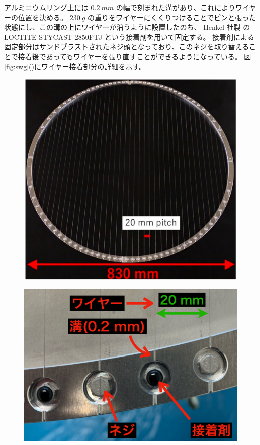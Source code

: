 \documentclass[../../main.tex]{subfiles}
\begin{document}
アルミニウムリング上には $\SI{0.2}{mm}$ の幅で刻まれた溝があり、これによりワイヤーの位置を決める。
$\SI{230}{g}$ の重りをワイヤーにくくりつけることでピンと張った状態にし、この溝の上にワイヤーが沿うように設置したのち、
Henkel 社製 の LOCTITE STYCAST 2850FTJ という接着剤を用いて固定する。
接着剤による固定部分はサンドブラストされたネジ頭となっており、このネジを取り替えることで接着後であってもワイヤーを張り直すことができるようになっている。
図\ref{fig:swg}()にワイヤー接着部分の詳細を示す。
\begin{figure}[H]
    \begin{minipage}[b]{0.48\columnwidth}
        \centering
        \includegraphics[width=\columnwidth]{wiregrid/wiregrid_appearance.pdf}
        \subcaption{}
        \label{fig:wiregrid_appearance}
    \end{minipage}
    \hspace{0.02\columnwidth}
    \begin{minipage}[b]{0.48\columnwidth}
        \centering
        \includegraphics[width=\columnwidth]{wiregrid/wire_detail_view.pdf}

\end{minipage}
\end{figure}
\end{document}
